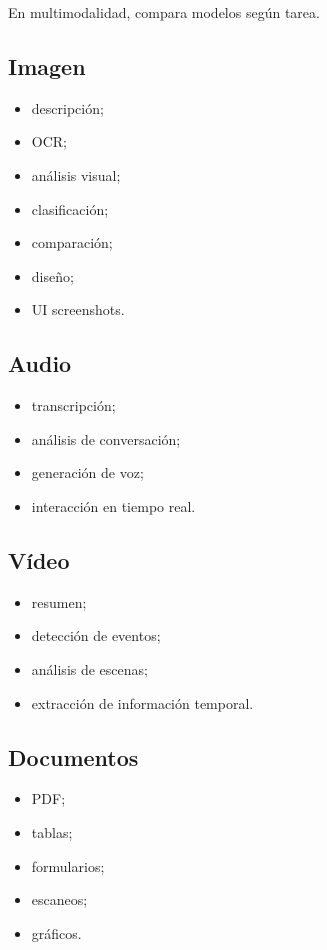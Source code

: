 En multimodalidad, compara modelos según tarea.

\subsection{Imagen}\label{imagen}

\begin{itemize}
\tightlist
\item
  descripción;
\item
  OCR;
\item
  análisis visual;
\item
  clasificación;
\item
  comparación;
\item
  diseño;
\item
  UI screenshots.
\end{itemize}

\subsection{Audio}\label{audio}

\begin{itemize}
\tightlist
\item
  transcripción;
\item
  análisis de conversación;
\item
  generación de voz;
\item
  interacción en tiempo real.
\end{itemize}

\subsection{Vídeo}\label{vuxeddeo}

\begin{itemize}
\tightlist
\item
  resumen;
\item
  detección de eventos;
\item
  análisis de escenas;
\item
  extracción de información temporal.
\end{itemize}

\subsection{Documentos}\label{documentos}

\begin{itemize}
\tightlist
\item
  PDF;
\item
  tablas;
\item
  formularios;
\item
  escaneos;
\item
  gráficos.
\end{itemize}

